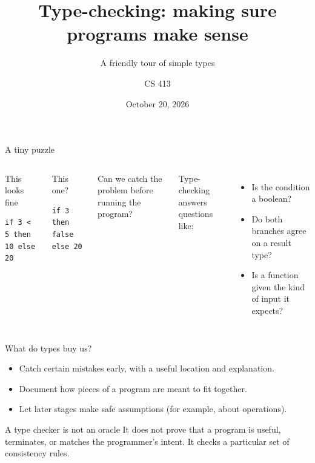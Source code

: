 \documentclass[aspectratio=169,11pt]{beamer}
\title[Type-checking]{Type-checking: making sure programs make sense}
\subtitle{A friendly tour of simple types}
\author{CS 413}
\date{October 20, 2026}
\begin{document}
\begin{frame}
  \titlepage
\end{frame}

\begin{frame}[fragile]{A tiny puzzle}
\begin{columns}[T]
\begin{block}{This looks fine}
\begin{lstlisting}
if 3 < 5 then 10 else 20
\end{lstlisting}
\end{block}
\begin{block}{This one?}
\begin{lstlisting}
if 3 then false else 20
\end{lstlisting}
\end{block}
Can we catch the problem before running the program?\medskip

Type-checking answers questions like:
\begin{itemize}
  \item Is the condition a boolean?
  \item Do both branches agree on a result type?
  \item Is a function given the kind of input it expects?
\end{itemize}
\end{columns}
\end{frame}

\begin{frame}{What do types buy us?}
\begin{itemize}
  \item Catch certain mistakes early, with a useful location and explanation.
  \item Document how pieces of a program are meant to fit together.
  \item Let later stages make safe assumptions (for example, about operations).
\end{itemize}
\bigskip
\begin{alertblock}{A type checker is not an oracle}
It does not prove that a program is useful, terminates, or matches the programmer's intent. It checks a particular set of consistency rules.
\end{alertblock}
\end{frame}
\end{document}
